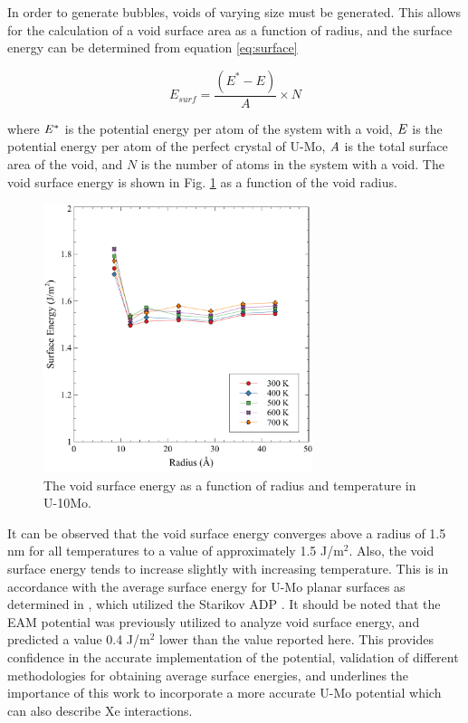 \documentclass[review]{elsarticle}
\begin{document}
In order to generate bubbles, voids of varying size must be generated. This allows for the calculation of a void surface area as a function of radius, and the surface energy can be determined from equation \ref{eq:surface}

\begin{equation}
\label{eq:surface}
E_{surf}= \frac{(E^{*} - E)}{A} \times N
\end{equation}

\noindent where $\it{E^{*}}$ is the potential energy per atom of the system with a void, $\it{E}$ is the potential energy per atom of the perfect crystal of U-Mo, $\it{A}$ is the total surface area of the void, and $\textit{N}$ is the number of atoms in the system with a void. The void surface energy is shown in Fig. \ref{fig:voidE} as a function of the void radius. 

\begin{figure}[h!]
 \centering
 \includegraphics[width=0.7\textwidth]{Esurf.pdf} 
 \caption{The void surface energy as a function of radius and temperature in U-10Mo.}
 \label{fig:voidE}
\end{figure}

\noindent It can be observed that the void surface energy converges above a radius of 1.5 nm for all temperatures to a value of approximately 1.5 J/m$^2$. Also, the void surface energy tends to increase slightly with increasing temperature. This is in accordance with the average surface energy for U-Mo planar surfaces as determined in \cite{beeler2018}, which utilized the Starikov ADP \cite{starikov2018}. It should be noted that the EAM potential was previously utilized to analyze void surface energy, and predicted a value 0.4 J/m$^2$ lower than the value reported here. This provides confidence in the accurate implementation of the potential, validation of different methodologies for obtaining average surface energies, and underlines the importance of this work to incorporate a more accurate U-Mo potential which can also describe Xe interactions.
\end{document}
